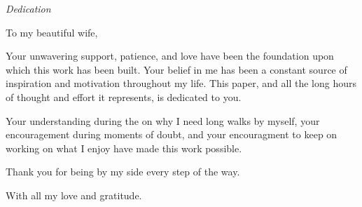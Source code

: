 \begin{dedication}
    \thispagestyle{empty}
    \vspace*{\fill}
    \begin{center}
        \Large\textit{Dedication}
        \vspace{1cm}
        
        To my beautiful wife,
        
        \vspace{0.5cm}
        
        Your unwavering support, patience, and love have been the foundation upon which this work has been built. Your belief in me has been a constant source of inspiration and motivation throughout my life. This paper, and all the long hours of thought and effort it represents, is dedicated to you.
        
        Your understanding during the on why I need long walks by myself, your encouragement during moments of doubt, and your encouragment to keep on working on what I enjoy have made this work possible. 
        
        Thank you for being by my side every step of the way.
        
        With all my love and gratitude.
    \end{center}
    \vspace*{\fill}
    \end{dedication}